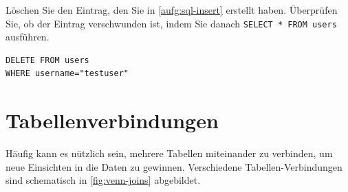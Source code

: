 \begin{aufgabe}{}
Löschen Sie den Eintrag, den Sie in \cref{aufg:sql-insert} erstellt haben. Überprüfen Sie, ob der Eintrag verschwunden ist, indem Sie danach \lstinline[style=sql]|SELECT * FROM users| ausführen.
\begin{myantwort}
\begin{lstlisting}[style=sql]
DELETE FROM users
WHERE username="testuser"
\end{lstlisting}
\end{myantwort}
\end{aufgabe}

\section{Tabellenverbindungen}
Häufig kann es nützlich sein, mehrere Tabellen miteinander zu verbinden, um neue Einsichten in die Daten zu gewinnen. Verschiedene Tabellen-Verbindungen sind schematisch in \cref{fig:venn-joins} abgebildet.


